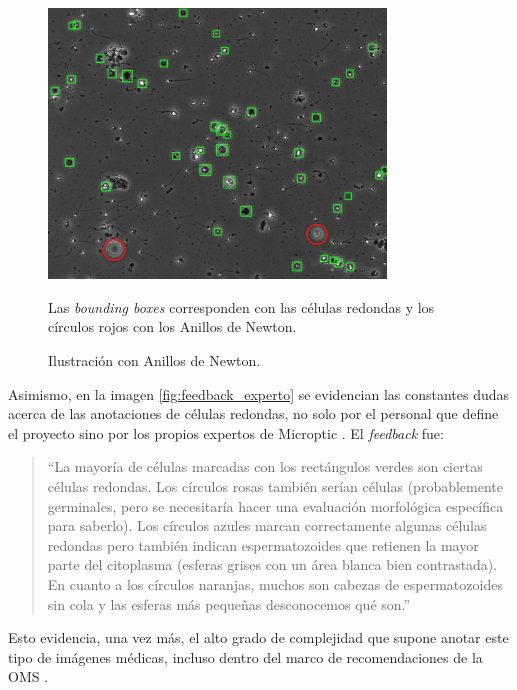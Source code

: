 \documentclass[12pt,a4paper,onecolumn,oneside]{report}
\begin{document}
\begin{figure}[H]
  \centering
  \includegraphics[width=0.8\textwidth]{figuras/rounds_cells/Anillos de Newton.png}
  \caption{Ilustración con Anillos de Newton.}
  \label{fig:Anillos_Newton}
  Las \textit{bounding boxes} corresponden con las células redondas y los círculos rojos con los Anillos de Newton.
\end{figure}

Asimismo, en la imagen \ref{fig:feedback_experto} se evidencian las constantes dudas acerca de las anotaciones de células redondas, no solo por el personal que define el proyecto sino por los propios expertos de Microptic \cite{microptic}. 
El \textit{feedback} fue:

\begin{quote}
“La mayoría de células marcadas con los rectángulos verdes son ciertas células redondas. Los círculos rosas también serían células (probablemente germinales, pero se necesitaría hacer una evaluación morfológica específica para saberlo). Los círculos azules marcan correctamente algunas células redondas pero también indican espermatozoides que retienen la mayor parte del citoplasma (esferas grises con un área blanca bien contrastada). En cuanto a los círculos naranjas, muchos son cabezas de espermatozoides sin cola y las esferas más pequeñas desconocemos qué son.”
\end{quote}

Esto evidencia, una vez más, el alto grado de complejidad que supone anotar este tipo de imágenes médicas, incluso dentro del marco de recomendaciones de la OMS \cite{OMS} \cite{BJBS}.
\end{document}
